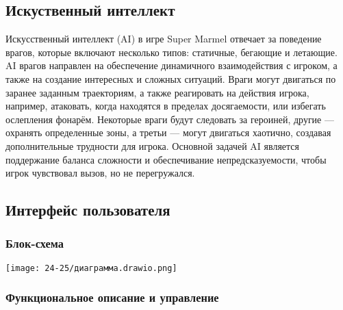 \documentclass[article,12pt, fleqn]{article}
\begin{document}
\begin{itemize}
\subsection{Искуственный интеллект}
Искусственный интеллект (AI) в игре Super Marmel отвечает за поведение врагов, которые включают несколько типов: статичные, бегающие и летающие. AI врагов направлен на обеспечение динамичного взаимодействия с игроком, а также на создание интересных и сложных ситуаций. Враги могут двигаться по заранее заданным траекториям, а также реагировать на действия игрока, например, атаковать, когда находятся в пределах досягаемости, или избегать ослепления фонарём. Некоторые враги будут следовать за героиней, другие — охранять определенные зоны, а третьи — могут двигаться хаотично, создавая дополнительные трудности для игрока. Основной задачей AI является поддержание баланса сложности и обеспечивание непредсказуемости, чтобы игрок чувствовал вызов, но не перегружался.

\subsection{Интерфейс пользователя}
\subsubsection{Блок-схема}
\begin{center}
    \texttt{[image: 24-25/диаграмма.drawio.png]}
\end{center}

\subsubsection{Функциональное описание и управление}


\end{itemize}
\end{document}
